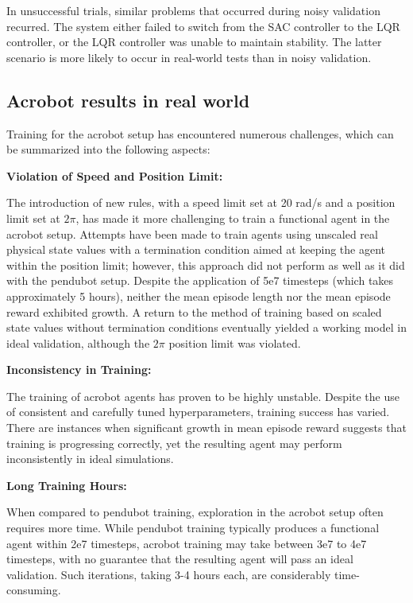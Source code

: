 In unsuccessful trials, similar problems that occurred during noisy validation recurred. The system either failed to switch from the SAC controller to the LQR controller, or the LQR controller was unable to maintain stability. The latter scenario is more likely to occur in real-world tests than in noisy validation.


\subsection{Acrobot results in real world}
Training for the acrobot setup has encountered numerous challenges, which can be summarized into the following aspects:

\textbf{Violation of Speed and Position Limit:}

The introduction of new rules, with a speed limit set at 20 rad/s and a position limit set at \(2\pi\), has made it more challenging to train a functional agent in the acrobot setup. Attempts have been made to train agents using unscaled real physical state values with a termination condition aimed at keeping the agent within the position limit; however, this approach did not perform as well as it did with the pendubot setup. Despite the application of 5e7 timesteps (which takes approximately 5 hours), neither the mean episode length nor the mean episode reward exhibited growth. A return to the method of training based on scaled state values without termination conditions eventually yielded a working model in ideal validation, although the \(2\pi\) position limit was violated.

\textbf{Inconsistency in Training:}

The training of acrobot agents has proven to be highly unstable. Despite the use of consistent and carefully tuned hyperparameters, training success has varied. There are instances when significant growth in mean episode reward suggests that training is progressing correctly, yet the resulting agent may perform inconsistently in ideal simulations.

\textbf{Long Training Hours:}

When compared to pendubot training, exploration in the acrobot setup often requires more time. While pendubot training typically produces a functional agent within 2e7 timesteps, acrobot training may take between 3e7 to 4e7 timesteps, with no guarantee that the resulting agent will pass an ideal validation. Such iterations, taking 3-4 hours each, are considerably time-consuming.


